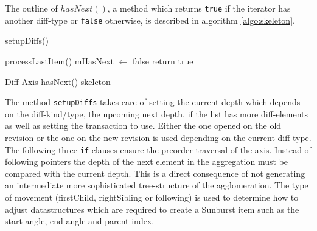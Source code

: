 The outline of $hasNext()$, a method which returns \texttt{true} if the iterator has another diff-type or \texttt{false} otherwise, is described in algorithm \ref{algo:skeleton}.

\begin{algorithm}[tb]
{}
\BlankLine
{}

setupDiffs()\;

processLastItem()\;
mHasNext $\leftarrow$ false\;
return true\;
\caption{Diff-Axis hasNext()-skeleton}\label{algo:skeleton}
\end{algorithm}

The method \texttt{setupDiffs} takes care of setting the current depth which depends on the diff-kind/type, the upcoming next depth, if the list has more diff-elements as well as setting the transaction to use. Either the one opened on the old revision or the one on the new revision is used depending on the current diff-type. The following three \texttt{if}-clauses ensure the preorder traversal of the axis. Instead of following pointers the depth of the next element in the aggregation must be compared with the current depth. This is a direct consequence of not generating an intermediate more sophisticated tree-structure of the agglomeration. The type of movement (firstChild, rightSibling or following) is used to determine how to adjust datastructures which are required to create a Sunburst item such as the start-angle, end-angle and parent-index. %

